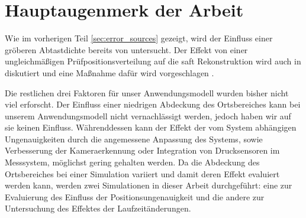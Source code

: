 
\section{Hauptaugenmerk der Arbeit} \label{sec:main_topic}
Wie im vorherigen Teil \ref{sec:error_sources} gezeigt, wird der Einfluss einer gröberen Abtastdichte bereits von \cite{Mooshofer16SAFTwithBiggerGridandArtifacts} untersucht. Der Effekt von einer ungleichmäßigen Prüfpositionsverteilung auf die \acrshort{saft} Rekonstruktion wird auch in \cite{Mayer16SAFTwithSmallData} diskutiert und eine Maßnahme dafür wird vorgeschlagen \cite{Mayer16SAFTwithSmallData}. \par
Die restlichen drei Faktoren für unser Anwendungsmodell wurden bisher nicht viel erforscht. Der Einfluss einer niedrigen Abdeckung des Ortsbereiches kann bei unserem Anwendungsmodell nicht vernachlässigt werden, jedoch haben wir auf sie keinen Einfluss. Währenddessen kann der Effekt der vom System abhängigen Ungenauigkeiten durch die angemessene Anpassung des Systems, sowie Verbesserung der Kameraerkennung oder Integration von Drucksensoren im Messsystem, möglichst gering gehalten werden. Da die Abdeckung des Ortsbereiches bei einer Simulation variiert und damit deren Effekt evaluiert werden kann, werden zwei Simulationen in dieser Arbeit durchgeführt: eine zur Evaluierung des Einfluss der Positionsungenauigkeit und die andere zur Untersuchung des Effektes der Laufzeitänderungen.